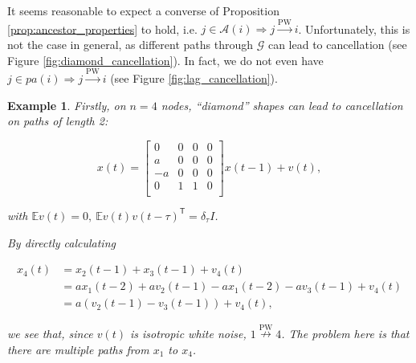 \documentclass{statsoc}
\def\pwgc{\overset{\text{PW}}{\rightarrow}}  %
\def\npwgc{\overset{\text{PW}}{\nrightarrow}}  %
\def\gcg{\mathcal{G}}  %
\newcommand{\pa}[1]{pa(#1)}  %
\newcommand{\anc}[1]{\mathcal{A}(#1)}  %
\newtheorem{example}{Example}
\def\E{\mathbb{E}}  %
\def\T{\mathsf{T}}  %
\begin{document}
It seems reasonable to expect a converse of Proposition
\ref{prop:ancestor_properties} to hold, i.e.
$j \in \anc{i} \Rightarrow j \pwgc i$.  Unfortunately, this is not the
case in general, as different paths through $\gcg$ can lead to
cancellation (see Figure \ref{fig:diamond_cancellation}).  In fact, we
do not even have $j \in \pa{i} \Rightarrow j \pwgc i$ (see Figure
\ref{fig:lag_cancellation}).

\begin{example}
  \label{ex:diamond_cancellation}
  Firstly, on $n = 4$ nodes, ``diamond'' shapes can lead to cancellation on paths of length 2:

\begin{equation*}
  x(t) =
  \left[
    \begin{array}{cccc}
      0 & 0 & 0 & 0\\
      a & 0 & 0 & 0\\
      -a & 0 & 0 & 0\\
      0 & 1 & 1 & 0\\
    \end{array}
  \right] x(t - 1) + v(t),
\end{equation*}

with $\E v(t) = 0,\ \E v(t)v(t - \tau)^\T = \delta_\tau I$.

By directly calculating

\begin{align*}
  x_4(t) &= x_2(t - 1) + x_3(t - 1) + v_4(t)\\
         &= ax_1(t - 2) + av_2(t - 1) - ax_1(t - 2) -av_3(t - 1) + v_4(t)\\
         &= a(v_2(t - 1) - v_3(t - 1)) + v_4(t),
\end{align*}

we see that, since $v(t)$ is isotropic white noise, $1 \npwgc 4$.  The problem here is that there are multiple paths from $x_1$ to $x_4$.
\end{example}
\end{document}
